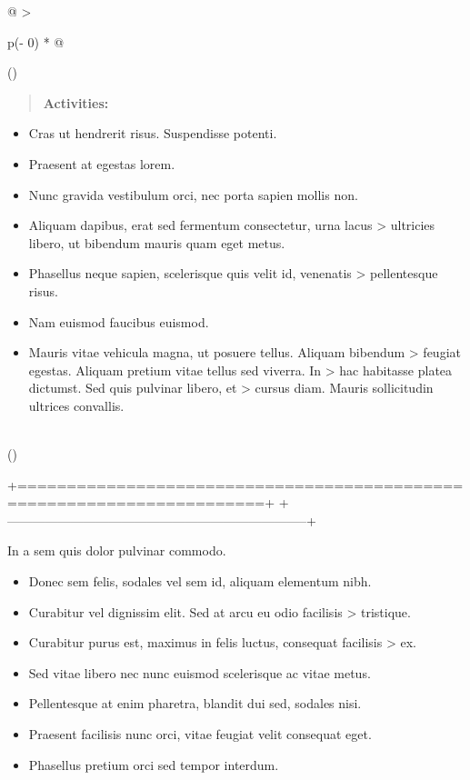 \documentclass[
]{book}
\begin{document}
\begin{longtable}[]{@{}
  >{\raggedright\arraybackslash}p{(\columnwidth - 0\tabcolsep) * }@{}}
\toprule()
\endhead
\begin{minipage}[t]{\linewidth}\raggedright
\begin{quote}
\textbf{Activities:}
\end{quote}

\begin{itemize}
\item
  Cras ut hendrerit risus. Suspendisse potenti.
\item
  Praesent at egestas lorem.
\item
  Nunc gravida vestibulum orci, nec porta sapien mollis non.
\item
  Aliquam dapibus, erat sed fermentum consectetur, urna lacus
  \textgreater{} ultricies libero, ut bibendum mauris quam eget metus.
\end{itemize}

\begin{itemize}
\item
  Phasellus neque sapien, scelerisque quis velit id, venenatis
  \textgreater{} pellentesque risus.
\item
  Nam euismod faucibus euismod.
\item
  Mauris vitae vehicula magna, ut posuere tellus. Aliquam bibendum
  \textgreater{} feugiat egestas. Aliquam pretium vitae tellus sed viverra. In
  \textgreater{} hac habitasse platea dictumst. Sed quis pulvinar libero, et
  \textgreater{} cursus diam. Mauris sollicitudin ultrices convallis.
\end{itemize}
\end{minipage} \\
\bottomrule()
\end{longtable}

+=======================================================================+
+-----------------------------------------------------------------------+

In a sem quis dolor pulvinar commodo.

\begin{itemize}
\item
  Donec sem felis, sodales vel sem id, aliquam elementum nibh.
\item
  Curabitur vel dignissim elit. Sed at arcu eu odio facilisis
  \textgreater{} tristique.
\item
  Curabitur purus est, maximus in felis luctus, consequat facilisis
  \textgreater{} ex.
\item
  Sed vitae libero nec nunc euismod scelerisque ac vitae metus.
\item
  Pellentesque at enim pharetra, blandit dui sed, sodales nisi.
\item
  Praesent facilisis nunc orci, vitae feugiat velit consequat eget.
\item
  Phasellus pretium orci sed tempor interdum.
\end{itemize}
\end{document}
